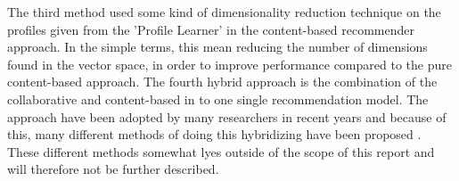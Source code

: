 The third method used some kind of dimensionality reduction technique on the profiles given from the 'Profile Learner' in the content-based recommender approach. In the simple terms, this mean reducing the number of dimensions found in the vector space, in order to improve performance compared to the pure content-based approach. \newline
The fourth hybrid approach is the combination of the collaborative and content-based in to one single recommendation model. The approach have been adopted by many researchers in recent years and because of this, many different methods of doing this hybridizing have been proposed \citep[p. 22]{TowardsTheNextGenerationOfRs}. These different methods somewhat lyes outside of the scope of this report and will therefore not be further described. \newline

